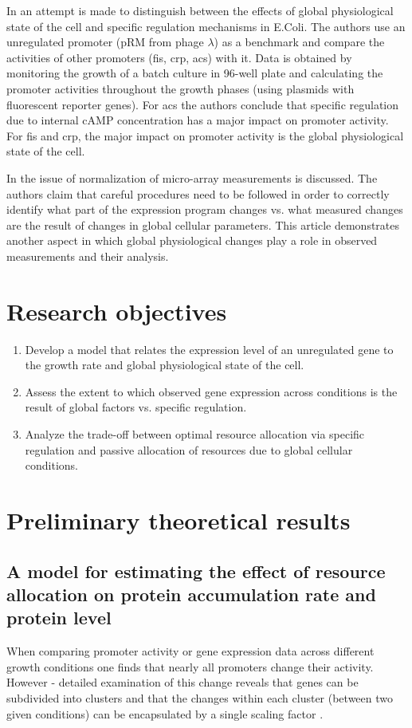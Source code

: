 \documentclass[a4page,notitlepage]{article}
\begin{document}
In \cite{Berthoumieux2013} an attempt is made to distinguish between the effects of global physiological state of the cell and specific regulation mechanisms in E.Coli.
The authors use an unregulated promoter (pRM from phage $\lambda$) as a benchmark and compare the activities of other promoters (fis, crp, acs) with it.
Data is obtained by monitoring the growth of a batch culture in 96-well plate and calculating the promoter activities throughout the growth phases (using plasmids with fluorescent reporter genes).
For acs the authors conclude that specific regulation due to internal cAMP concentration has a major impact on promoter activity.
For fis and crp, the major impact on promoter activity is the global physiological state of the cell.

In \cite{loven2012} the issue of normalization of micro-array measurements is discussed.
The authors claim that careful procedures need to be followed in order to correctly identify what part of the expression program changes vs. what measured changes are the result of changes in global cellular parameters.
This article demonstrates another aspect in which global physiological changes play a role in observed measurements and their analysis.

\section{Research objectives}
\begin{enumerate}
\item Develop a model that relates the expression level of an unregulated gene to the growth rate and global physiological state of the cell.
\item Assess the extent to which observed gene expression across conditions is the result of global factors vs. specific regulation.
\item Analyze the trade-off between optimal resource allocation via specific regulation and passive allocation of resources due to global cellular conditions.
\end{enumerate}
\section{Preliminary theoretical results}
\subsection{A model for estimating the effect of resource allocation on protein accumulation rate and protein level}
When comparing promoter activity or gene expression data across different growth conditions one finds that nearly all promoters change their activity.
However - detailed examination of this change reveals that genes can be subdivided into clusters and that the changes within each cluster (between two given conditions) can be encapsulated by a single scaling factor \cite{Leeat2013}.
\end{document}
